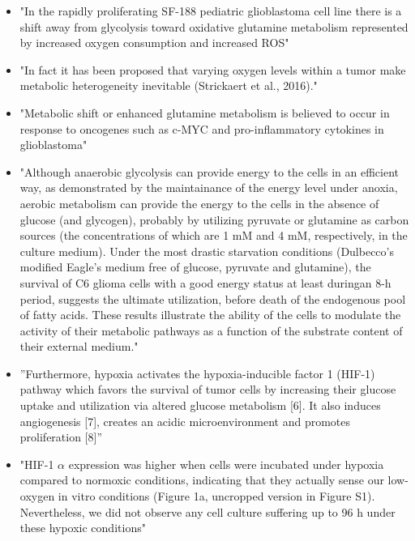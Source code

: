 \documentclass[11pt,a4paper]{article}
\begin{document}
\begin{itemize}
\item "In the rapidly proliferating SF-188 pediatric glioblastoma cell line there is a shift away from glycolysis toward oxidative glutamine metabolism represented by increased oxygen consumption and increased ROS"\cite{Strickland2017}

\item "In fact it has been proposed that varying oxygen levels within a tumor make metabolic heterogeneity inevitable (Strickaert et al., 2016)."\cite{Strickland2017}

\item "Metabolic shift or enhanced glutamine metabolism is believed to occur in response to oncogenes such as c-MYC and pro-inflammatory cytokines in glioblastoma" \cite{Stuart2023}

\item "Although anaerobic glycolysis can provide energy to the cells in an efficient way, as demonstrated by the maintainance of the energy level under anoxia, aerobic metabolism can provide the energy to the cells in the absence of glucose (and glycogen), probably by utilizing pyruvate or glutamine as carbon sources (the concentrations of which are 1 mM and 4 mM, respectively, in the culture medium). Under the most drastic starvation conditions (Dulbecco’s modified Eagle’s medium free of glucose, pyruvate and glutamine), the survival of C6 glioma cells with a good energy status at least duringan
8-h period, suggests the ultimate utilization, before death of the endogenous pool of fatty acids. These results illustrate the ability of the cells to modulate the activity of their metabolic pathways as a function of the substrate content of their external medium."\cite{Piannet1991}

\item ”Furthermore, hypoxia activates the hypoxia-inducible factor 1 (HIF-1) pathway which favors the survival of tumor cells by increasing their glucose uptake and utilization via altered glucose metabolism [6]. It also induces angiogenesis [7], creates an acidic microenvironment and promotes proliferation [8]”\cite{Shen2020}

\item "HIF-1 $\alpha$ expression was higher when cells were incubated under hypoxia compared to normoxic conditions, indicating that they actually sense our low-oxygen in vitro conditions (Figure 1a, uncropped version in Figure S1). Nevertheless, we did not observe any cell culture suffering up to 96 h under these hypoxic conditions"\cite{Bailleul2021}


\end{itemize}
\end{document}
